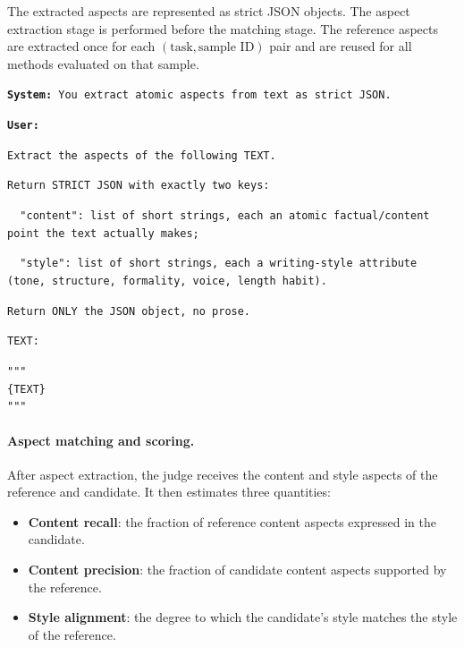 \documentclass{article} %
\begin{document}
The extracted aspects are represented as strict JSON objects. The aspect extraction stage is performed before the matching stage. The reference aspects are extracted once for each $(\text{task},\text{sample ID})$ pair and are reused for all methods evaluated on that sample.

\begin{tcolorbox}[
    colback=gray!5,
    colframe=black!45,
    title=Aspect extraction prompt,
    breakable,
    left=3pt,
    right=3pt,
    top=3pt,
    bottom=3pt
]
\small
\texttt{\textbf{System:} You extract atomic aspects from text as strict JSON.}

\medskip

\texttt{\textbf{User:}}

\texttt{Extract the aspects of the following TEXT.}

\texttt{Return STRICT JSON with exactly two keys:}

\texttt{\ \ "content": list of short strings, each an atomic factual/content point the text actually makes;}

\texttt{\ \ "style": list of short strings, each a writing-style attribute (tone, structure, formality, voice, length habit).}

\texttt{Return ONLY the JSON object, no prose.}

\medskip

\texttt{TEXT:}

\texttt{"""}\\
\texttt{\{TEXT\}}\\
\texttt{"""}
\end{tcolorbox}

\paragraph{Aspect matching and scoring.}
After aspect extraction, the judge receives the content and style aspects of the reference and candidate. It then estimates three quantities:

\begin{itemize}
    \item \textbf{Content recall}: the fraction of reference content aspects expressed in the candidate.
    \item \textbf{Content precision}: the fraction of candidate content aspects supported by the reference.
    \item \textbf{Style alignment}: the degree to which the candidate's style matches the style of the reference.
\end{itemize}
\end{document}
